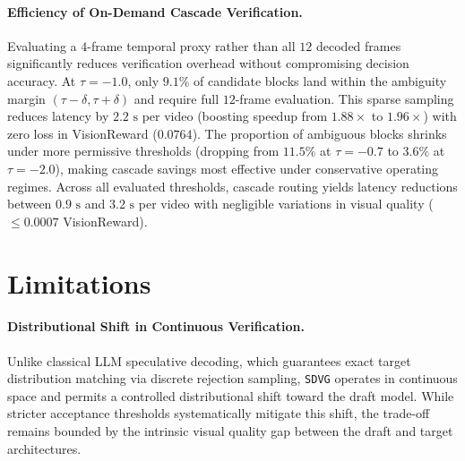 \documentclass{article} %
\newcommand{\threshold}{\tau}
\begin{document}
\paragraph{Efficiency of On-Demand Cascade Verification.}
Evaluating a $4$-frame temporal proxy rather than all $12$ decoded frames significantly reduces verification overhead without compromising decision accuracy. At $\threshold = -1.0$, only $9.1\%$ of candidate blocks land within the ambiguity margin $(\threshold - \delta, \threshold + \delta)$ and require full $12$-frame evaluation. This sparse sampling reduces latency by $2.2\text{~s}$ per video (boosting speedup from $1.88\times$ to $1.96\times$) with zero loss in VisionReward ($0.0764$). The proportion of ambiguous blocks shrinks under more permissive thresholds (dropping from $11.5\%$ at $\threshold = -0.7$ to $3.6\%$ at $\threshold = -2.0$), making cascade savings most effective under conservative operating regimes. Across all evaluated thresholds, cascade routing yields latency reductions between $0.9\text{~s}$ and $3.2\text{~s}$ per video with negligible variations in visual quality ($\le 0.0007$ VisionReward).





\section{Limitations}

\paragraph{Distributional Shift in Continuous Verification.}
Unlike classical LLM speculative decoding, which guarantees exact target distribution matching via discrete rejection sampling, \texttt{SDVG} operates in continuous space and permits a controlled distributional shift toward the draft model. While stricter acceptance thresholds systematically mitigate this shift, the trade-off remains bounded by the intrinsic visual quality gap between the draft and target architectures.
\end{document}
